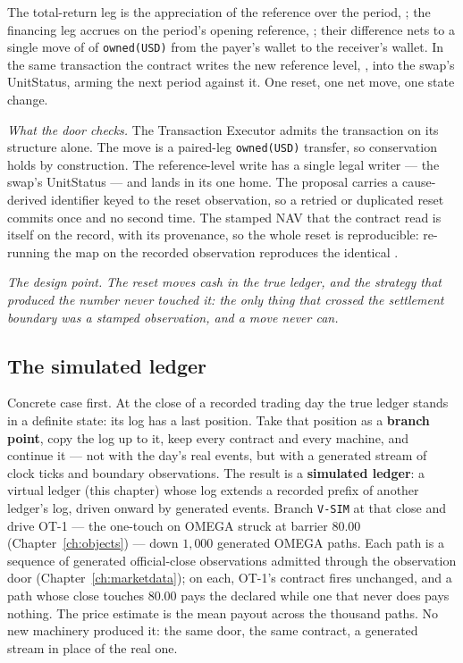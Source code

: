 The total-return leg is the appreciation of the reference over the period,
; the financing leg accrues on the period's opening reference,
; their difference nets to a single move of  of
\texttt{owned(USD)} from the payer's wallet to the receiver's wallet. In the same
transaction the contract writes the new reference level, ,
into the swap's UnitStatus, arming the next period against it. One reset, one net
move, one state change.

\emph{What the door checks.} The Transaction Executor admits the transaction on
its structure alone. The  move is a paired-leg
\texttt{owned(USD)} transfer, so conservation holds by construction. The
reference-level write has a single legal writer --- the swap's UnitStatus --- and
lands in its one home. The proposal carries a cause-derived identifier keyed to
the reset observation, so a retried or duplicated reset commits once and no
second time. The stamped NAV that the contract read is itself on the record, with
its provenance, so the whole reset is reproducible: re-running the map on the
recorded observation reproduces the identical .

\emph{The design point.} \emph{The reset moves cash in the true ledger, and the
strategy that produced the number never touched it: the only thing that crossed
the settlement boundary was a stamped observation, and a move never can.}

\subsection{The simulated ledger}\label{sec:simulated}

Concrete case first. At the close of a recorded trading day the true ledger stands in a
definite state: its log has a last position. Take that position as a \textbf{branch point},
copy the log up to it, keep every contract and every machine, and continue it --- not with
the day's real events, but with a generated stream of clock ticks and boundary observations.
The result is a \textbf{simulated ledger}: a virtual ledger (this chapter) whose log extends
a recorded prefix of another ledger's log, driven onward by generated events. Branch
\texttt{V-SIM} at that close and drive OT-1 --- the one-touch on OMEGA struck at barrier
$80.00$ (Chapter~\ref{ch:objects}) --- down $1{,}000$ generated OMEGA paths. Each path is a
sequence of generated official-close observations admitted through the observation door
(Chapter~\ref{ch:marketdata}); on each, OT-1's contract fires unchanged, and a path whose
close touches $80.00$ pays the declared  while one that never does pays
nothing. The price estimate is the mean payout across the thousand paths. No new machinery
produced it: the same door, the same contract, a generated stream in place of the real one.

